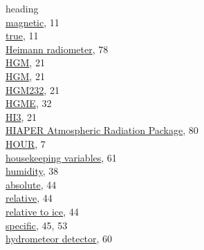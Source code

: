 \documentclass[
]{book}
\begin{document}
heading\\
\hspace*{0.333em}\hspace*{0.333em}\href{./3-the-state-of-the-aircraft.html\#thdg}{magnetic}, 11\\
\hspace*{0.333em}\hspace*{0.333em}\href{./3-the-state-of-the-aircraft.html\#thdg}{true}, 11\\
\href{./8-radiation-variables.html\#rstx}{Heimann radiometer}, 78\\
\href{./3-the-state-of-the-aircraft.html\#hgm}{HGM}, 21\\
\href{./3-the-state-of-the-aircraft.html\#hgme-159}{HGM}, 21\\
\href{./3-the-state-of-the-aircraft.html\#hgm-232}{HGM232}, 21\\
\href{./3-the-state-of-the-aircraft.html\#hgme-159}{HGME}, 32\\
\href{./3-the-state-of-the-aircraft.html\#hi3}{HI3}, 21\\
\href{./7-aerosol-particle-measurements.html\#harp}{HIAPER Atmospheric Radiation Package}, 80\\
\href{./2-general-information-about-data-files.html\#hms\%7C}{HOUR}, 7\\
\href{./5-cloud-physics-variables.html\#sensors-1-D-probes}{housekeeping variables}, 61\\
\href{./4-the-state-of-the-atmosphere.html\#humidity}{humidity}, 38\\
\hspace*{0.333em}\hspace*{0.333em}\href{./4-the-state-of-the-atmosphere.html\#rho}{absolute}, 44\\
\hspace*{0.333em}\hspace*{0.333em}\href{./4-the-state-of-the-atmosphere.html\#rhumw}{relative}, 44\\
\hspace*{0.333em}\hspace*{0.333em}\href{./4-the-state-of-the-atmosphere.html\#rhumi}{relative to ice}, 44\\
\hspace*{0.333em}\hspace*{0.333em}\href{./4-the-state-of-the-atmosphere.html\#sphum}{specific}, 45, 53\\
\href{./5-cloud-physics-variables.html\#VariableNames1DProbes}{hydrometeor detector}, 60\\
\end{document}
